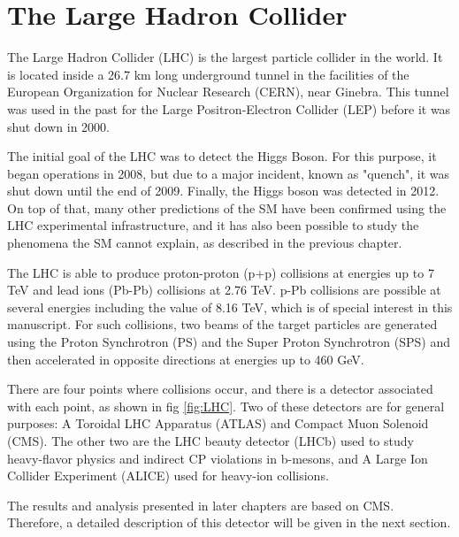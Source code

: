 \chapter{\leavevmode\newline The Large Hadron Collider}
\label{chap:chapter_2}

The Large Hadron Collider (LHC) is the largest particle collider in the world. It is located inside a 26.7 km long underground tunnel in the facilities of the European Organization for Nuclear Research (CERN), near Ginebra. This tunnel was used in the past for the Large Positron-Electron Collider (LEP) before it was shut down in 2000.

The initial goal of the LHC was to detect the Higgs Boson. For this purpose, it began operations in 2008, but due to a major incident, known as "quench", it was shut down until the end of 2009. Finally, the Higgs boson was detected in 2012. On top of that, many other predictions of the SM have been confirmed using the LHC experimental infrastructure, and it has also been possible to study the phenomena the SM cannot explain, as described in the previous chapter.

The LHC is able to produce proton-proton (p+p) collisions at energies up to 7 TeV and lead ions (Pb-Pb) collisions at 2.76 TeV. p-Pb collisions are possible at several energies \cite{vovchenko2019canonical}  including the value of 8.16 TeV, which is of special interest in this manuscript. For such collisions, two beams of the target particles are generated using the Proton Synchrotron (PS) and the Super Proton Synchrotron (SPS) and then accelerated in opposite directions at energies up to 460 GeV.

There are four points where collisions occur, and there is a detector associated with each point, as shown in fig \ref{fig:LHC}. Two of these detectors are for general purposes: A Toroidal LHC Apparatus (ATLAS) and Compact Muon Solenoid (CMS). The other two are the LHC beauty detector (LHCb) used to study heavy-flavor physics and indirect CP violations in b-mesons, and A Large Ion Collider Experiment (ALICE) used for heavy-ion collisions.

The results and analysis presented in later chapters are based on CMS. Therefore, a detailed description of this detector will be given in the next section.


